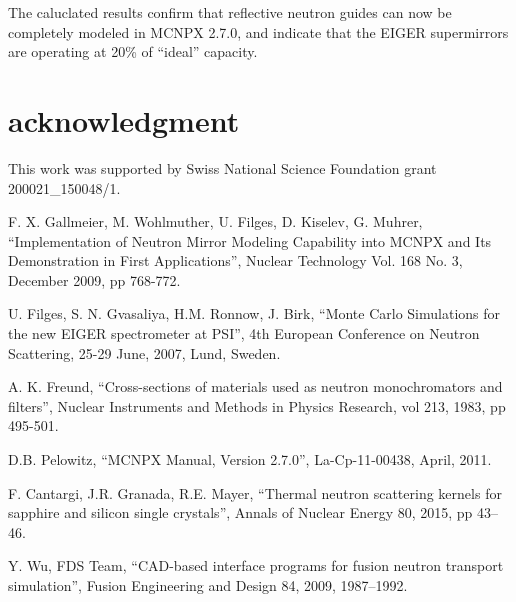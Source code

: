 \documentclass[a4paper,
              ]{jacow}
\begin{document}
The caluclated results confirm that reflective neutron guides can now be completely modeled in MCNPX 2.7.0, and indicate that the EIGER supermirrors are operating at 20\% of ``ideal'' capacity.  

\section{acknowledgment}

This work was supported by Swiss National Science Foundation grant 200021\_150048/1.

\begin{thebibliography}{9}   %

  F. X. Gallmeier, M. Wohlmuther, U. Filges, D. Kiselev, G. Muhrer,
  ``Implementation of Neutron Mirror Modeling Capability into MCNPX and Its Demonstration in First Applications'',
  Nuclear Technology Vol. 168 No. 3, December 2009, pp 768-772. 

  U. Filges, S. N. Gvasaliya, H.M. Ronnow, J. Birk,
  ``Monte Carlo Simulations for the new EIGER spectrometer at PSI'',
  4th European Conference on Neutron Scattering, 25-29 June, 2007, Lund, Sweden. 

A. K. Freund,
``Cross-sections of materials used as neutron monochromators and filters'',
Nuclear Instruments and Methods in Physics Research, vol 213, 1983, pp 495-501.

   D.B. Pelowitz,
   ``MCNPX Manual, Version 2.7.0'',
   La-Cp-11-00438, April, 2011.

  F. Cantargi, J.R. Granada, R.E. Mayer, 
  ``Thermal neutron scattering kernels for sapphire and silicon single crystals'', 
  Annals of Nuclear Energy 80, 2015, pp 43–46.  

  Y. Wu, FDS Team, 
  ``CAD-based interface programs for fusion neutron transport simulation'', 
  Fusion Engineering and Design 84, 2009, 1987–1992. \\

\end{thebibliography}
\end{document}
